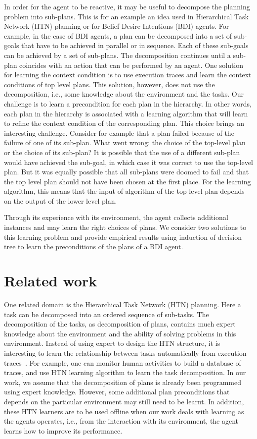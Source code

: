 \documentclass{article}
\begin{document}
In order for the agent to be reactive, it may be useful to decompose the planning problem into sub-plans. This is for an example an idea used in Hierarchical Task Network (HTN) planning or for Belief Desire Intentions (BDI) agents.  For example, in the case of BDI agents, a plan can be decomposed into a set of sub-goals that have to be achieved in parallel or in sequence. Each of these sub-goals can be achieved by a set of sub-plans. The decomposition continues until a sub-plan coincides with an action that can be performed by an agent. One solution for learning the context condition is to use execution traces and learn the context conditions of top level plans. This solution, however, does not use the decomposition, i.e., some knowledge about the environment and the tasks. Our challenge is to learn a precondition for each plan in the hierarchy.  In other words, each plan in the hierarchy is associated with a learning algorithm that will learn to refine the context condition of the corresponding plan. This choice brings an interesting challenge. Consider for example that a plan failed because of the failure of one of its sub-plan. What went wrong: the choice of the top-level plan or the choice of its sub-plan?  It is possible that the use of a different sub-plan would have achieved the sub-goal, in which case it was correct to use the top-level plan. But it was equally possible that all sub-plans were doomed to fail and that the top level plan should not have been chosen at the first place.  For the learning algorithm, this means that the input of algorithm of the top level plan depends on the output of the lower level plan. 

Through its experience with its environment, the agent collects additional instances and may learn the right choices of plans. We consider two solutions to this learning problem and provide empirical results using induction of decision tree to learn the preconditions of the plans of a BDI agent.


\section{Related work}

One related domain is the Hierarchical Task Network (HTN) planning. Here a task can be decomposed into an ordered sequence of sub-tasks.  The decomposition of the tasks, as decomposition of plans, contains much expert knowledge about the environment and the ability of solving problems in this environment. Instead of using expert to design the HTN structure, it is interesting to learn the relationship between tasks automatically from execution traces~\cite{Zhuo09:Learning,Ilghami05:Learning,Hogg08:htnmaker}. For example, one can monitor human activities to build a database of traces, and use HTN learning algorithm to learn the task decomposition. In our work, we assume that the decomposition of plans is already been programmed using expert knowledge. However, some additional plan preconditions that depends on the particular environment may still need to be learnt. In addition, these HTN learners are to be used offline when our work deals with learning as the agents operates, i.e., from the interaction with its environment, the agent learns how to improve its performance.
\end{document}
